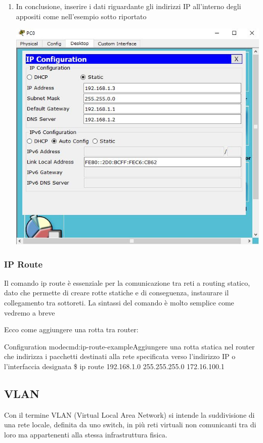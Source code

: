\begin{enumerate}
\begin{sfigure}
    \end{sfigure}
    \item In conclusione, inserire i dati riguardante gli indirizzi IP all’interno degli appositi come nell’esempio sotto riportato\par
    \begin{sfigure}
        \includegraphics[width=0.6\linewidth]{images/07.routing-sicurezza/routing-statico/04.ip-config-complete.jpg}
    \end{sfigure}
\end{enumerate}

\subsubsection*{IP Route}
Il comando ip route è essenziale per la comunicazione tra reti a routing statico, dato che permette di creare rotte statiche e di conseguenza, instaurare il collegamento tra sottoreti. La sintassi del comando è molto semplice come vedremo a breve

Ecco come aggiungere una rotta tra router:

\begin{cmds}[Router]{Configuration mode}{cmd:ip-route-example}{Aggiungere una rotta statica nel router che indirizza i pacchetti destinati alla \textcolor{Highlight1}{rete specificata} verso l'\textcolor{Highlight2}{indirizzo IP o l'interfaccia} designata }
    \$ ip route \textcolor{Highlight1}{192.168.1.0 255.255.255.0} \textcolor{Highlight2}{172.16.100.1}
\end{cmds}

\subsection{VLAN}
Con il termine VLAN (Virtual Local Area Network) si intende la suddivisione di una rete locale, definita da uno switch, in più reti virtuali non comunicanti tra di loro ma appartenenti alla stessa infrastruttura fisica.

